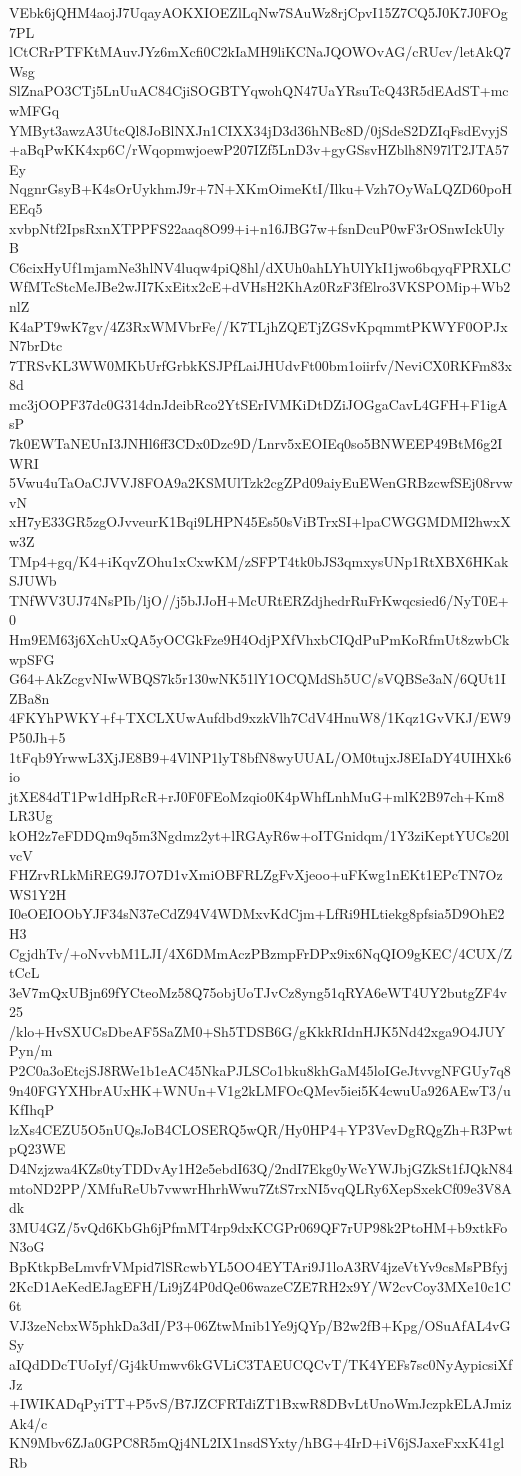 VEbk6jQHM4aojJ7UqayAOKXIOEZlLqNw7SAuWz8rjCpvI15Z7CQ5J0K7J0FOg7PL
lCtCRrPTFKtMAuvJYz6mXcfi0C2kIaMH9liKCNaJQOWOvAG/cRUcv/letAkQ7Wsg
SlZnaPO3CTj5LnUuAC84CjiSOGBTYqwohQN47UaYRsuTcQ43R5dEAdST+mcwMFGq
YMByt3awzA3UtcQl8JoBlNXJn1CIXX34jD3d36hNBc8D/0jSdeS2DZIqFsdEvyjS
+aBqPwKK4xp6C/rWqopmwjoewP207IZf5LnD3v+gyGSsvHZblh8N97lT2JTA57Ey
NqgnrGsyB+K4sOrUykhmJ9r+7N+XKmOimeKtI/Ilku+Vzh7OyWaLQZD60poHEEq5
xvbpNtf2IpsRxnXTPPFS22aaq8O99+i+n16JBG7w+fsnDcuP0wF3rOSnwIckUlyB
C6cixHyUf1mjamNe3hlNV4luqw4piQ8hl/dXUh0ahLYhUlYkI1jwo6bqyqFPRXLC
WfMTcStcMeJBe2wJI7KxEitx2cE+dVHsH2KhAz0RzF3fElro3VKSPOMip+Wb2nlZ
K4aPT9wK7gv/4Z3RxWMVbrFe//K7TLjhZQETjZGSvKpqmmtPKWYF0OPJxN7brDtc
7TRSvKL3WW0MKbUrfGrbkKSJPfLaiJHUdvFt00bm1oiirfv/NeviCX0RKFm83x8d
mc3jOOPF37dc0G314dnJdeibRco2YtSErIVMKiDtDZiJOGgaCavL4GFH+F1igAsP
7k0EWTaNEUnI3JNHl6ff3CDx0Dzc9D/Lnrv5xEOIEq0so5BNWEEP49BtM6g2IWRI
5Vwu4uTaOaCJVVJ8FOA9a2KSMUlTzk2cgZPd09aiyEuEWenGRBzcwfSEj08rvwvN
xH7yE33GR5zgOJvveurK1Bqi9LHPN45Es50sViBTrxSI+lpaCWGGMDMI2hwxXw3Z
TMp4+gq/K4+iKqvZOhu1xCxwKM/zSFPT4tk0bJS3qmxysUNp1RtXBX6HKakSJUWb
TNfWV3UJ74NsPIb/ljO//j5bJJoH+McURtERZdjhedrRuFrKwqcsied6/NyT0E+0
Hm9EM63j6XchUxQA5yOCGkFze9H4OdjPXfVhxbCIQdPuPmKoRfmUt8zwbCkwpSFG
G64+AkZcgvNIwWBQS7k5r130wNK51lY1OCQMdSh5UC/sVQBSe3aN/6QUt1IZBa8n
4FKYhPWKY+f+TXCLXUwAufdbd9xzkVlh7CdV4HnuW8/1Kqz1GvVKJ/EW9P50Jh+5
1tFqb9YrwwL3XjJE8B9+4VlNP1lyT8bfN8wyUUAL/OM0tujxJ8EIaDY4UIHXk6io
jtXE84dT1Pw1dHpRcR+rJ0F0FEoMzqio0K4pWhfLnhMuG+mlK2B97ch+Km8LR3Ug
kOH2z7eFDDQm9q5m3Ngdmz2yt+lRGAyR6w+oITGnidqm/1Y3ziKeptYUCs20lvcV
FHZrvRLkMiREG9J7O7D1vXmiOBFRLZgFvXjeoo+uFKwg1nEKt1EPcTN7OzWS1Y2H
I0eOEIOObYJF34sN37eCdZ94V4WDMxvKdCjm+LfRi9HLtiekg8pfsia5D9OhE2H3
CgjdhTv/+oNvvbM1LJI/4X6DMmAczPBzmpFrDPx9ix6NqQIO9gKEC/4CUX/ZtCcL
3eV7mQxUBjn69fYCteoMz58Q75objUoTJvCz8yng51qRYA6eWT4UY2butgZF4v25
/klo+HvSXUCsDbeAF5SaZM0+Sh5TDSB6G/gKkkRIdnHJK5Nd42xga9O4JUYPyn/m
P2C0a3oEtcjSJ8RWe1b1eAC45NkaPJLSCo1bku8khGaM45loIGeJtvvgNFGUy7q8
9n40FGYXHbrAUxHK+WNUn+V1g2kLMFOcQMev5iei5K4cwuUa926AEwT3/uKfIhqP
lzXs4CEZU5O5nUQsJoB4CLOSERQ5wQR/Hy0HP4+YP3VevDgRQgZh+R3PwtpQ23WE
D4Nzjzwa4KZs0tyTDDvAy1H2e5ebdI63Q/2ndI7Ekg0yWcYWJbjGZkSt1fJQkN84
mtoND2PP/XMfuReUb7vwwrHhrhWwu7ZtS7rxNI5vqQLRy6XepSxekCf09e3V8Adk
3MU4GZ/5vQd6KbGh6jPfmMT4rp9dxKCGPr069QF7rUP98k2PtoHM+b9xtkFoN3oG
BpKtkpBeLmvfrVMpid7lSRcwbYL5OO4EYTAri9J1loA3RV4jzeVtYv9csMsPBfyj
2KcD1AeKedEJagEFH/Li9jZ4P0dQe06wazeCZE7RH2x9Y/W2cvCoy3MXe10c1C6t
VJ3zeNcbxW5phkDa3dI/P3+06ZtwMnib1Ye9jQYp/B2w2fB+Kpg/OSuAfAL4vGSy
aIQdDDcTUoIyf/Gj4kUmwv6kGVLiC3TAEUCQCvT/TK4YEFs7sc0NyAypicsiXfJz
+IWIKADqPyiTT+P5vS/B7JZCFRTdiZT1BxwR8DBvLtUnoWmJczpkELAJmizAk4/c
KN9Mbv6ZJa0GPC8R5mQj4NL2IX1nsdSYxty/hBG+4IrD+iV6jSJaxeFxxK41glRb

